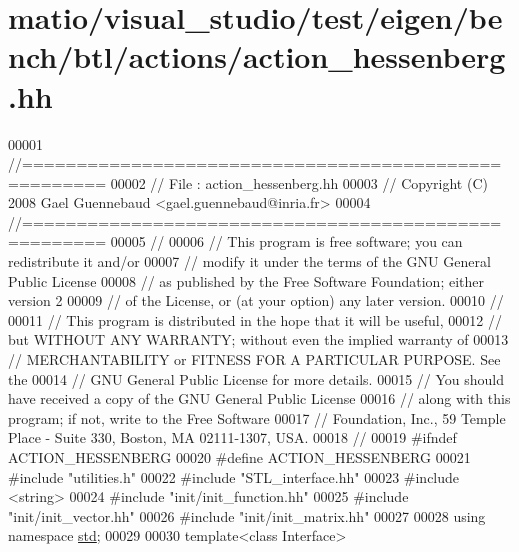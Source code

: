 \hypertarget{matio_2visual__studio_2test_2eigen_2bench_2btl_2actions_2action__hessenberg_8hh_source}{}\section{matio/visual\+\_\+studio/test/eigen/bench/btl/actions/action\+\_\+hessenberg.hh}
\label{matio_2visual__studio_2test_2eigen_2bench_2btl_2actions_2action__hessenberg_8hh_source}

\begin{DoxyCode}
00001 \textcolor{comment}{//=====================================================}
00002 \textcolor{comment}{// File   :  action\_hessenberg.hh}
00003 \textcolor{comment}{// Copyright (C) 2008 Gael Guennebaud <gael.guennebaud@inria.fr>}
00004 \textcolor{comment}{//=====================================================}
00005 \textcolor{comment}{//}
00006 \textcolor{comment}{// This program is free software; you can redistribute it and/or}
00007 \textcolor{comment}{// modify it under the terms of the GNU General Public License}
00008 \textcolor{comment}{// as published by the Free Software Foundation; either version 2}
00009 \textcolor{comment}{// of the License, or (at your option) any later version.}
00010 \textcolor{comment}{//}
00011 \textcolor{comment}{// This program is distributed in the hope that it will be useful,}
00012 \textcolor{comment}{// but WITHOUT ANY WARRANTY; without even the implied warranty of}
00013 \textcolor{comment}{// MERCHANTABILITY or FITNESS FOR A PARTICULAR PURPOSE.  See the}
00014 \textcolor{comment}{// GNU General Public License for more details.}
00015 \textcolor{comment}{// You should have received a copy of the GNU General Public License}
00016 \textcolor{comment}{// along with this program; if not, write to the Free Software}
00017 \textcolor{comment}{// Foundation, Inc., 59 Temple Place - Suite 330, Boston, MA  02111-1307, USA.}
00018 \textcolor{comment}{//}
00019 \textcolor{preprocessor}{#ifndef ACTION\_HESSENBERG}
00020 \textcolor{preprocessor}{#define ACTION\_HESSENBERG}
00021 \textcolor{preprocessor}{#include "utilities.h"}
00022 \textcolor{preprocessor}{#include "STL\_interface.hh"}
00023 \textcolor{preprocessor}{#include <string>}
00024 \textcolor{preprocessor}{#include "init/init\_function.hh"}
00025 \textcolor{preprocessor}{#include "init/init\_vector.hh"}
00026 \textcolor{preprocessor}{#include "init/init\_matrix.hh"}
00027 
00028 \textcolor{keyword}{using namespace }\hyperlink{namespacestd}{std};
00029 
00030 \textcolor{keyword}{template}<\textcolor{keyword}{class} Interface>

\end{DoxyCode}
